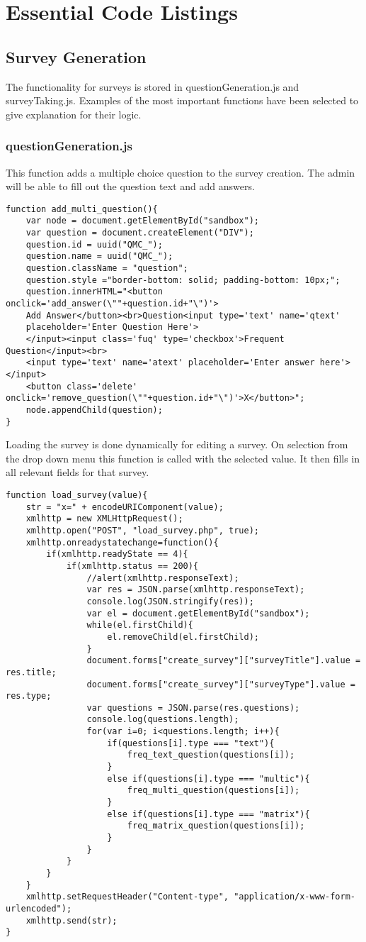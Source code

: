 \documentclass[../final.tex]{subfiles}
\begin{document}
\section{Essential Code Listings}
\subsection{Survey Generation}
The functionality for surveys is stored in questionGeneration.js 
and surveyTaking.js. Examples of the most important functions 
have been selected to give explanation for their logic. \\
\subsubsection{questionGeneration.js}
This function adds a multiple choice question to the 
survey creation. The admin will be able to fill out 
the question text and add answers. 
\begin{lstlisting}
function add_multi_question(){
	var node = document.getElementById("sandbox");
	var question = document.createElement("DIV");
	question.id = uuid("QMC_"); 
	question.name = uuid("QMC_");
	question.className = "question";
	question.style ="border-bottom: solid; padding-bottom: 10px;";
	question.innerHTML="<button onclick='add_answer(\""+question.id+"\")'>
	Add Answer</button><br>Question<input type='text' name='qtext'
	placeholder='Enter Question Here'>
	</input><input class='fuq' type='checkbox'>Frequent Question</input><br>
	<input type='text' name='atext' placeholder='Enter answer here'></input>
	<button class='delete' onclick='remove_question(\""+question.id+"\")'>X</button>";
	node.appendChild(question); 	
}
\end{lstlisting}
Loading the survey is done dynamically for editing a survey.
On selection from the drop down menu this function is 
called with the selected value. It then fills in all 
relevant fields for that survey. \\
\begin{lstlisting}
function load_survey(value){
	str = "x=" + encodeURIComponent(value);
	xmlhttp = new XMLHttpRequest();
	xmlhttp.open("POST", "load_survey.php", true);
	xmlhttp.onreadystatechange=function(){
		if(xmlhttp.readyState == 4){
			if(xmlhttp.status == 200){
				//alert(xmlhttp.responseText);
				var res = JSON.parse(xmlhttp.responseText);
				console.log(JSON.stringify(res));
				var el = document.getElementById("sandbox");
				while(el.firstChild){
					el.removeChild(el.firstChild);
				}
				document.forms["create_survey"]["surveyTitle"].value = res.title;
				document.forms["create_survey"]["surveyType"].value = res.type;
				var questions = JSON.parse(res.questions);
				console.log(questions.length);
				for(var i=0; i<questions.length; i++){
					if(questions[i].type === "text"){
						freq_text_question(questions[i]);	
					}
					else if(questions[i].type === "multic"){
						freq_multi_question(questions[i]);	
					}
					else if(questions[i].type === "matrix"){
						freq_matrix_question(questions[i]);	
					}
				}
			}
		}	
	}
	xmlhttp.setRequestHeader("Content-type", "application/x-www-form-urlencoded");
	xmlhttp.send(str);	
}

\end{lstlisting}
\end{document}
